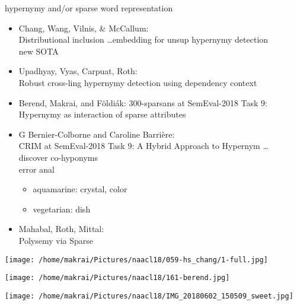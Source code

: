 \documentclass{beamer}
\begin{document}
      \begin{frame}[allowframebreaks]{hypernymy and/or sparse word representation}
        \begin{itemize}
          \item Chang, Wang, Vilnis, \& McCallum: \\  Distributional inclusion \dots  embedding for
            unsup hypernymy detection
            \\ new SOTA
          \item Upadhyay, Vyas, Carpuat, Roth: \\  Robust cross-ling hypernymy detection using dependency context
          \item Berend, Makrai, and Földiák: 300-sparsans at SemEval-2018 Task 9: \\ Hypernymy as interaction of sparse attributes
          \item G Bernier-Colborne and Caroline Barrière: \\  CRIM at SemEval-2018 Task 9: A
            Hybrid Approach to Hypernym \dots 
            \\ discover co-hyponyms
            \\ error anal
            \begin{itemize}
              \item aquamarine: crystal, color
              \item vegetarian: dish
            \end{itemize}
          \item Mahabal, Roth, Mittal: \\  Polysemy via Sparse
        \end{itemize}
        \texttt{[image: /home/makrai/Pictures/naacl18/059-hs\_chang/1-full.jpg]}

        \texttt{[image: /home/makrai/Pictures/naacl18/161-berend.jpg]}
      \end{frame}

\begin{frame}
  \texttt{[image: /home/makrai/Pictures/naacl18/IMG\_20180602\_150509\_sweet.jpg]}
\end{frame}
\end{document}
